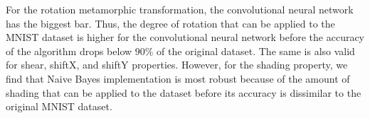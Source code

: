 
For the rotation metamorphic transformation, the convolutional neural network has the biggest bar. Thus, the degree of rotation that can be applied to the MNIST dataset is higher for the convolutional neural network before the accuracy of the algorithm drops below $90\%$ of the original dataset. The same is also valid for shear, shiftX, and shiftY properties. However, for the shading property, we find that Naive Bayes implementation is most robust because of the amount of shading that can be applied to the dataset before its accuracy is dissimilar to the original MNIST dataset.



\fashionx
    
\fashiony


